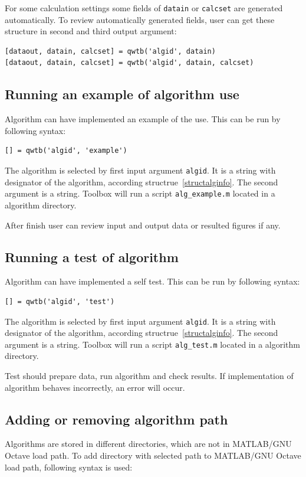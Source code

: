 \documentclass[12pt]{article} %
\def\matlab{{\sc MATLAB}\xspace}
\def\octave{{\sc GNU Octave}\xspace}
\def\mgo{\matlab/\octave\xspace}
\begin{document}
For some calculation settings some fields of \lstinline{datain} or \lstinline{calcset} are generated
automatically. To review automatically generated fields, user can get these structure in second and
third output argument:

\begin{lstlisting}
[dataout, datain, calcset] = qwtb('algid', datain)
[dataout, datain, calcset] = qwtb('algid', datain, calcset)
\end{lstlisting}

\subsection{Running an example of algorithm use} %
Algorithm can have implemented an example of the use. This can be run by following syntax:

\begin{lstlisting}
[] = qwtb('algid', 'example')
\end{lstlisting}

The algorithm is selected by first input argument \lstinline{algid}. It is a string with
designator of the algorithm, according structrue~\ref{structalginfo}. The second argument is a
string. Toolbox will run a script \lstinline{alg_example.m} located in a algorithm directory.

After finish user can review input and output data or resulted figures if any.

\subsection{Running a test of algorithm} %
Algorithm can have implemented a self test. This can be run by following syntax:

\begin{lstlisting}
[] = qwtb('algid', 'test')
\end{lstlisting}

The algorithm is selected by first input argument \lstinline{algid}. It is a string with
designator of the algorithm, according structrue~\ref{structalginfo}. The second argument is a
string. Toolbox will run a script \lstinline{alg_test.m} located in a algorithm directory.

Test should prepare data, run algorithm and check results. If implementation of algorithm
behaves incorrectly, an error will occur.

\subsection{Adding or removing algorithm path} %
Algorithms are stored in different directories, which are not in \mgo load path. To add directory
with selected path to \mgo load path, following syntax is used:
\end{document}
